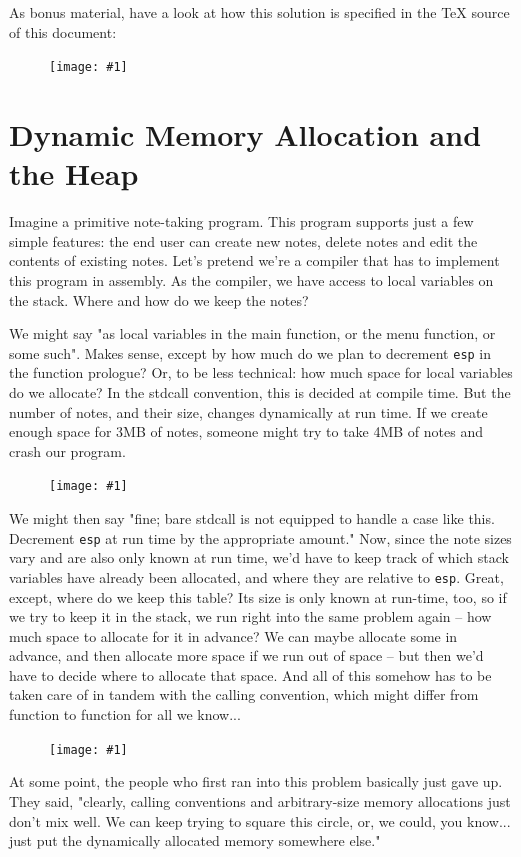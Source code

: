 \documentclass{article}
\newcommand{\displayimage}[1] {
\begin{figure}[H]
    \centering
    \texttt{[image: \#1]} 
\end{figure}
}
\newcommand{\wrapimageright}[1] {
    \begin{figure}
        \begin{center}
            \texttt{[image: \#1]} 
        \end{center}
    \end{figure}
}
\newcommand{\wrapimageleft}[1] {
    \begin{figure}
        \begin{center}
            \texttt{[image: \#1]} 
        \end{center}
    \end{figure}
}
\newcommand{\xcode}[2]{\colorbox{ubuntuback}{\lstinline[language=#1]|#2|}}
\newcommand{\asm}[1]{\xcode{{[x86masm]assembler}}{#1}}
\begin{document}
As bonus material, have a look at how this solution is specified in the TeX source of this document:

\displayimage{../14_cmd2/tex_source.png}

\section{Dynamic Memory Allocation and the Heap}

Imagine a primitive note-taking program. This program supports just a few simple features: the end user can create new notes, delete notes and edit the contents of existing notes.  Let's pretend we're a compiler that has to implement this program in assembly. As the compiler, we have access to local variables on the stack. Where and how do we keep the notes?

We might say "as local variables in the main function, or the menu function, or some such". Makes sense, except by how much do we plan to decrement \asm{esp} in the function prologue? Or, to be less technical: how much space for local variables do we allocate? In the stdcall convention, this is decided at compile time. But the number of notes, and their size, changes dynamically at run time. If we create enough space for 3MB of notes, someone might try to take 4MB of notes and crash our program.

\wrapimageright{./images/c_heap.png}
We might then say "fine; bare stdcall is not equipped to handle a case like this. Decrement \asm{esp} at run time by the appropriate amount." Now, since the note sizes vary and are also only known at run time, we'd have to keep track of which stack variables have already been allocated, and where they are relative to \asm{esp}. Great, except, where do we keep this table? Its size is only known at run-time, too, so if we try to keep it in the stack, we run right into the same problem again -- how much space to allocate for it in advance? We can maybe allocate some in advance, and then allocate more space if we run out of space -- but then we'd have to decide where to allocate that space. And all of this somehow has to be taken care of in tandem with the calling convention, which might differ from function to function for all we know... 

\wrapimageleft{./images/process_memory.jpg}
At some point, the people who first ran into this problem basically just gave up. They said, "clearly, calling conventions and arbitrary-size memory allocations just don't mix well. We can keep trying to square this circle, or, we could, you know... just put the dynamically allocated memory somewhere else."
\end{document}
